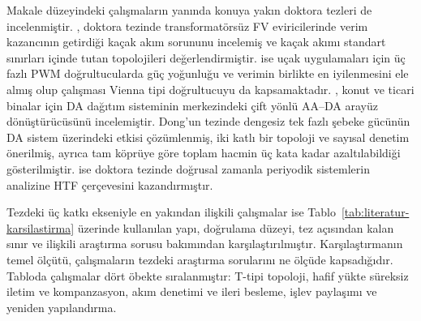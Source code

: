 Makale düzeyindeki çalışmaların yanında konuya yakın doktora tezleri de incelenmiştir. \citet{Kerekes2009}, doktora tezinde transformatörsüz FV eviricilerinde verim kazancının getirdiği kaçak akım sorununu incelemiş ve kaçak akımı standart sınırları içinde tutan topolojileri değerlendirmiştir. \citet{Hartmann2011} ise uçak uygulamaları için üç fazlı PWM doğrultucularda güç yoğunluğu ve verimin birlikte en iyilenmesini ele almış olup çalışması Vienna tipi doğrultucuyu da kapsamaktadır. \citet{Dong2012}, konut ve ticari binalar için DA dağıtım sisteminin merkezindeki çift yönlü AA--DA arayüz dönüştürücüsünü incelemiştir. Dong'un tezinde dengesiz tek fazlı şebeke gücünün DA sistem üzerindeki etkisi çözümlenmiş, iki katlı bir topoloji ve sayısal denetim önerilmiş, ayrıca tam köprüye göre toplam hacmin üç kata kadar azaltılabildiği gösterilmiştir. \citet{Wereley1991} ise doktora tezinde doğrusal zamanla periyodik sistemlerin analizine HTF çerçevesini kazandırmıştır.

Tezdeki üç katkı ekseniyle en yakından ilişkili çalışmalar ise Tablo~\ref{tab:literatur-karsilastirma} üzerinde kullanılan yapı, doğrulama düzeyi, tez açısından kalan sınır ve ilişkili araştırma sorusu bakımından karşılaştırılmıştır. Karşılaştırmanın temel ölçütü, çalışmaların tezdeki araştırma sorularını ne ölçüde kapsadığıdır. Tabloda çalışmalar dört öbekte sıralanmıştır: T-tipi topoloji, hafif yükte süreksiz iletim ve kompanzasyon, akım denetimi ve ileri besleme, işlev paylaşımı ve yeniden yapılandırma.

